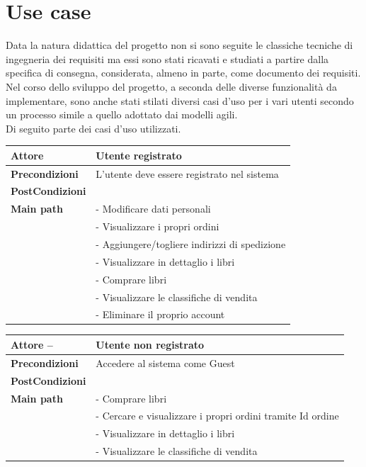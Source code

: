 \documentclass[a4paper,12pt,titlepage]{article}
\begin{document}
\section{Use case}\label{sec:casiduso}
Data la natura didattica del progetto non si sono seguite le classiche tecniche di ingegneria dei requisiti ma essi sono stati ricavati e studiati a partire dalla specifica di consegna, considerata, almeno in parte, come documento dei requisiti.
Nel corso dello sviluppo del progetto, a seconda delle diverse funzionalità da implementare,
sono anche stati stilati diversi casi d’uso per i vari utenti secondo un processo simile a quello
adottato dai modelli agili.\\
Di seguito parte dei casi d’uso utilizzati.
\vspace{0.3cm}
	{\renewcommand\arraystretch{1.5}{
	\renewcommand\tabcolsep{0pt}{
	\begin{table}[H]			
			
			\begin{tabular}{p{5cm} p{10cm} }
			\hline
			\textbf{Attore} & \textbf{Utente registrato} \\ \hline
			\textbf{Precondizioni} & L'utente deve essere registrato nel sistema\\ \hline
			\textbf{PostCondizioni}&  \\ \hline
			\textbf{Main path} &  - Modificare dati personali\\ 
			& - Visualizzare i propri ordini\\
			& - Aggiungere/togliere indirizzi di spedizione \\
			& - Visualizzare in dettaglio i libri\\
			& - Comprare libri\\
			& - Visualizzare le classifiche di vendita\\
			& - Eliminare il proprio account \\ \hline
			 \end{tabular}
		\end{table}
	}}
\vspace{0.3cm}
	{\renewcommand\arraystretch{1.5}{
	\renewcommand\tabcolsep{0pt}{
	\begin{table}[H]			
			\begin{tabular}{p{5cm} p{10cm} }
			\hline
			\textbf{Attore} --& \textbf{Utente non registrato} \\ \hline
			\textbf{Precondizioni} & Accedere al sistema come Guest\\ \hline
			\textbf{PostCondizioni} &  \\ \hline
			\textbf{Main path} & - Comprare libri\\
			& - Cercare e visualizzare i propri ordini tramite Id ordine\\
			& - Visualizzare in dettaglio i libri\\
			& - Visualizzare le classifiche di vendita\\ \hline
			 \end{tabular}
		\end{table}
	}}

}}
\end{document}
